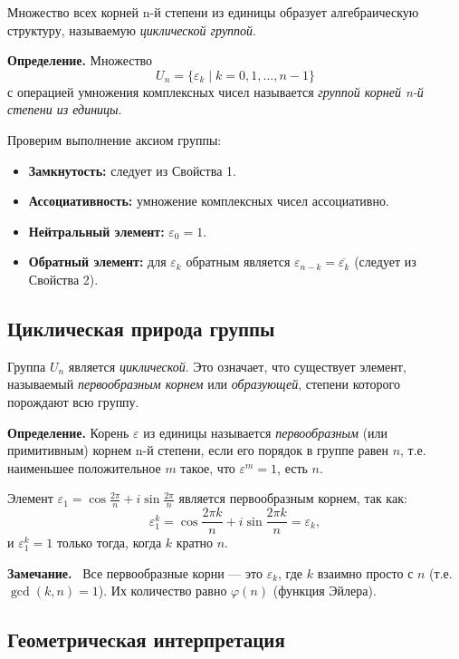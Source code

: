 \documentclass[a4paper,12pt]{article}
\newcommand{\myremark}{\textbf{Замечание.}\ }
\theoremstyle{definition}
\theoremstyle{plain}
\theoremstyle{remark}
\begin{document}
	Множество всех корней n-й степени из единицы образует алгебраическую структуру, называемую \textit{циклической группой}.
	
	\medskip
	\noindent \textbf{Определение.} Множество
	\[
	U_n = \{ \varepsilon_k \mid k = 0, 1, \dots, n-1 \}
	\]
	с операцией умножения комплексных чисел называется \textit{группой корней n-й степени из единицы}.
	
	\medskip
	Проверим выполнение аксиом группы:
	\begin{itemize}
		\item \textbf{Замкнутость:} следует из Свойства 1.
		\item \textbf{Ассоциативность:} умножение комплексных чисел ассоциативно.
		\item \textbf{Нейтральный элемент:} \( \varepsilon_0 = 1 \).
		\item \textbf{Обратный элемент:} для \( \varepsilon_k \) обратным является \( \varepsilon_{n-k} = \overline{\varepsilon_k} \) (следует из Свойства 2).
	\end{itemize}
	
	\subsection{Циклическая природа группы}
	
	Группа \( U_n \) является \textit{циклической}. Это означает, что существует элемент, называемый \textit{первообразным корнем} или \textit{образующей}, степени которого порождают всю группу.
	
	\medskip
	\noindent \textbf{Определение.} Корень \( \varepsilon \) из единицы называется \textit{первообразным} (или примитивным) корнем n-й степени, если его порядок в группе равен \( n \), т.е. наименьшее положительное \( m \) такое, что \( \varepsilon^m = 1 \), есть \( n \).
	
	\medskip
	Элемент \( \varepsilon_1 = \cos \frac{2\pi}{n} + i \sin \frac{2\pi}{n} \) является первообразным корнем, так как:
	\[
	\varepsilon_1^k = \cos \frac{2\pi k}{n} + i \sin \frac{2\pi k}{n} = \varepsilon_k,
	\]
	и \( \varepsilon_1^k = 1 \) только тогда, когда \( k \) кратно \( n \).
	
	\myremark
	Все первообразные корни — это \( \varepsilon_k \), где \( k \) взаимно просто с \( n \) (т.е. \( \gcd(k, n) = 1 \)). Их количество равно \( \varphi(n) \) (функция Эйлера).
	
	\subsection{Геометрическая интерпретация}
	
\end{document}
